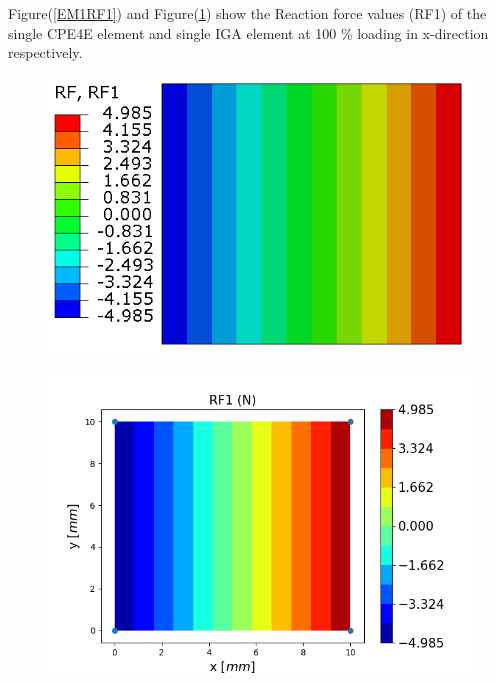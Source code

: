\documentclass[11pt]{article}
\begin{document}
Figure(\ref{EM1RF1}) and Figure(\ref{EM1RF1_IGA}) show the Reaction force values (RF1) of the single CPE4E element and single IGA element at 100 \% loading in x-direction respectively. \\
\begin{figure}[H]
	\centering
	\begin{minipage}{.5\textwidth}
		\centering
		\includegraphics[width=1\linewidth]{EM1RF1.png}
		\label{EM1RF1}
	\end{minipage}%
	\begin{minipage}{.6\textwidth}
		\centering
		\includegraphics[width=1\linewidth]{EM1RF1_IGA.png}
		\label{EM1RF1_IGA}
	\end{minipage}
\end{figure}
\end{document}
